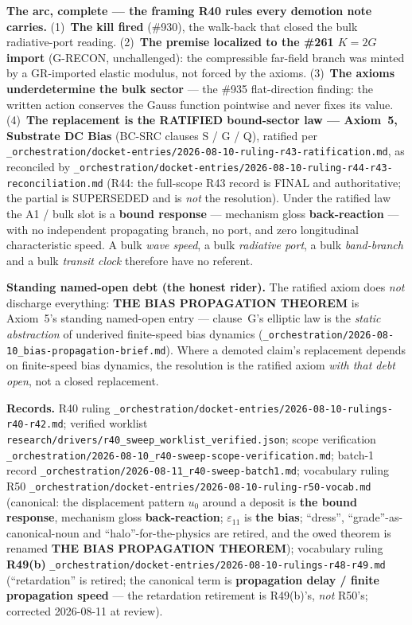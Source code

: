 \noindent\textbf{The arc, complete --- the framing R40 rules every demotion note
carries.} (1)~\textbf{The kill fired} (\#930), the walk-back that closed the bulk
radiative-port reading. (2)~\textbf{The premise localized to the \#261 $K = 2G$ import}
(G-RECON, unchallenged): the compressible far-field branch was minted by a GR-imported
elastic modulus, not forced by the axioms. (3)~\textbf{The axioms underdetermine the bulk
sector} --- the \#935 flat-direction finding: the written action conserves the Gauss
function pointwise and never fixes its value. (4)~\textbf{The replacement is the RATIFIED
bound-sector law --- Axiom~5, Substrate DC Bias} (BC-SRC clauses S / G / Q), ratified per
\texttt{\_orchestration/docket-entries/2026-08-10-ruling-r43-ratification.md}, as reconciled by \texttt{\_orchestration/docket-entries/2026-08-10-ruling-r44-r43-reconciliation.md} (R44: the
full-scope R43 record is FINAL and authoritative; the partial
\texttt{} is SUPERSEDED and is \emph{not} the
resolution). Under the ratified law the A1 / bulk slot is a \textbf{bound response} ---
mechanism gloss \textbf{back-reaction} --- with no independent propagating branch, no port,
and zero longitudinal characteristic speed. A bulk \emph{wave speed}, a bulk \emph{radiative
port}, a bulk \emph{band-branch} and a bulk \emph{transit clock} therefore have no referent.

\noindent\textbf{Standing named-open debt (the honest rider).} The ratified axiom does
\emph{not} discharge everything: \textbf{THE BIAS PROPAGATION THEOREM} is Axiom~5's standing
named-open entry --- clause~G's elliptic law is the \emph{static abstraction} of underived
finite-speed bias dynamics (\texttt{\_orchestration/2026-08-10\_bias-propagation-brief.md}). Where a demoted claim's
replacement depends on finite-speed bias dynamics, the resolution is the ratified axiom
\emph{with that debt open}, not a closed replacement.

\noindent\textbf{Records.} R40 ruling \texttt{\_orchestration/docket-entries/2026-08-10-rulings-r40-r42.md}; verified worklist
\texttt{research/drivers/r40\_sweep\_worklist\_verified.json}; scope verification \texttt{\_orchestration/2026-08-10\_r40-sweep-scope-verification.md};
batch-1 record \texttt{\_orchestration/2026-08-11\_r40-sweep-batch1.md}; vocabulary ruling R50
\texttt{\_orchestration/docket-entries/2026-08-10-ruling-r50-vocab.md} (canonical: the displacement pattern $u_0$ around a deposit is
\textbf{the bound response}, mechanism gloss \textbf{back-reaction}; $\varepsilon_{11}$ is
\textbf{the bias}; ``dress'', ``grade''-as-canonical-noun and ``halo''-for-the-physics are
retired, and the owed theorem is renamed \textbf{THE BIAS PROPAGATION THEOREM}); vocabulary ruling
\textbf{R49(b)} \texttt{\_orchestration/docket-entries/2026-08-10-rulings-r48-r49.md}
(``retardation'' is retired; the canonical term is \textbf{propagation delay / finite propagation
speed} --- the retardation retirement is R49(b)'s, \emph{not} R50's; corrected 2026-08-11 at review).

